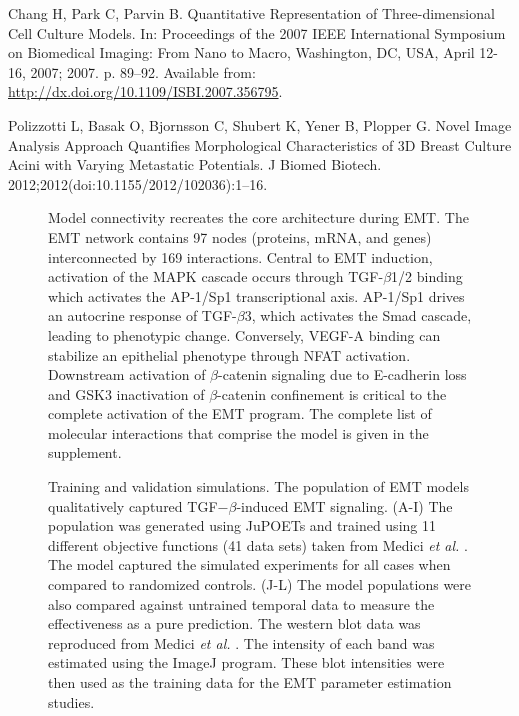 \documentclass[11pt,letterpaper]{article}
\begin{document}
\begin{thebibliography}{10}
Chang H, Park C, Parvin B.
\newblock Quantitative Representation of Three-dimensional Cell Culture Models.
\newblock In: Proceedings of the 2007 {IEEE} International Symposium on
  Biomedical Imaging: From Nano to Macro, Washington, DC, USA, April 12-16,
  2007; 2007. p. 89--92.
\newblock Available from: \url{http://dx.doi.org/10.1109/ISBI.2007.356795}.

Polizzotti L, Basak O, Bjornsson C, Shubert K, Yener B, Plopper G.
\newblock Novel Image Analysis Approach Quantifies Morphological
  Characteristics of 3D Breast Culture Acini with Varying Metastatic
  Potentials.
\newblock J Biomed Biotech. 2012;2012(doi:10.1155/2012/102036):1--16.

\end{thebibliography}

\clearpage

\begin{figure}
\caption{Model connectivity recreates the core architecture during EMT. The EMT network contains 97 nodes (proteins, mRNA, and genes) interconnected by 169 interactions.
Central to EMT induction, activation of the MAPK cascade occurs through TGF-$\beta$1/2 binding which activates the AP-1/Sp1 transcriptional axis. AP-1/Sp1 drives an autocrine response of TGF-$\beta$3, which activates the Smad cascade, leading to phenotypic change. Conversely, VEGF-A binding can stabilize an epithelial phenotype through NFAT activation.
Downstream activation of $\beta$-catenin signaling due to E-cadherin loss and GSK3 inactivation of $\beta$-catenin confinement is critical to the complete activation of the EMT program.
The complete list of molecular interactions that comprise the model is given in the supplement.}\label{fg:F1}
\end{figure}

\clearpage

\begin{figure}
\caption{Training and validation simulations. The population of EMT models qualitatively captured TGF$-\beta$-induced EMT signaling.
(A-I) The population was generated using JuPOETs and trained using 11 different objective functions (41 data sets) taken from Medici \emph{et al.} \cite{Medici:2008fk}.
The model captured the simulated experiments for all cases when compared to randomized controls.
(J-L)  The model populations were also compared against untrained temporal data to measure the effectiveness as a pure prediction.
The western blot data was reproduced from Medici \emph{et al.} \cite{Medici:2008fk}. The intensity of each band was estimated using the ImageJ program.
These blot intensities were then used as the training data for the EMT parameter estimation studies. }\label{fg:F2}
\end{figure}
\end{document}
